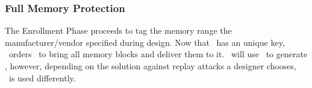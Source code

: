 \subsubsection{Full Memory Protection}
\label{subsubsec:Full-Memory-Protection}

The Enrollment Phase proceeds to tag the memory range the manufacturer\slash{}vendor specified during design. Now that \ptaggen~has an unique key, \seceng~orders \handler~to bring all memory blocks and deliver them to it. \seceng~will use \ptaggen~to generate \ptags, however, depending on the solution against replay attacks a designer chooses, \ptaggen~is used differently. 




